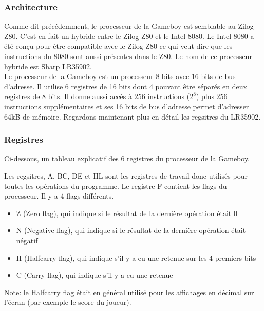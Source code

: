 \documentclass[a4paper]{article}
\begin{document}
\subsubsection{Architecture}
Comme dit précédemment, le processeur de la Gameboy est semblable au Zilog Z80.
C'est en fait un hybride entre le Zilog Z80 et le Intel 8080. Le Intel 8080 a été
conçu pour être compatible avec le Zilog Z80 ce qui veut dire que les instructions
du 8080 sont aussi présentes dans le Z80. Le nom de ce processeur hybride est Sharp
LR35902. \\

Le processeur de la Gameboy est un processeur 8 bits avec 16 bits de bus d'adresse.
Il utilise 6 registres de 16 bits dont 4 pouvant être séparés en deux registres de
8 bits. Il donne aussi accès à 256 instructions ($2^{8}$) plus 256 instructions
supplémentaires et ses 16 bits de bus d'adresse permet d'adresser 64kB de mémoire.
Regardons maintenant plus en détail les regsitres du LR35902.

\subsubsection{Registres}
Ci-dessous, un tableau explicatif des 6 registres du processeur de la Gameboy.
\begin{center}
\end{center}
Les regsitres, A, BC, DE et HL sont les registres de travail donc utilisés pour
toutes les opérations du programme. Le registre F contient les flags du processeur.
Il y a 4 flags différents.
\begin{itemize}[label=\textbullet]
	\item Z (Zero flag), qui indique si le résultat de la dernière opération était 0
	\item N (Negative flag), qui indique si le résultat de la dernière opération était négatif
	\item H (Halfcarry flag), qui indique s'il y a eu une retenue sur les 4 premiers bits
	\item C (Carry flag), qui indique s'il y a eu une retenue
\end{itemize}
Note: le Halfcarry flag était en général utilisé pour les affichages en décimal sur
l'écran (par exemple le score du joueur).
\end{document}

